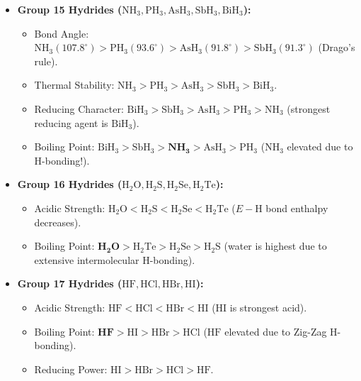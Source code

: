 \documentclass[11pt,a4paper]{article}
\begin{document}
\begin{usecasebox}
\begin{itemize}
  \item \textbf{Group 15 Hydrides ($\text{NH}_3, \text{PH}_3, \text{AsH}_3, \text{SbH}_3, \text{BiH}_3$):}
  \begin{itemize}
    \item Bond Angle: $\text{NH}_3 (107.8^\circ) > \text{PH}_3 (93.6^\circ) > \text{AsH}_3 (91.8^\circ) > \text{SbH}_3 (91.3^\circ)$ (Drago's rule).
    \item Thermal Stability: $\text{NH}_3 > \text{PH}_3 > \text{AsH}_3 > \text{SbH}_3 > \text{BiH}_3$.
    \item Reducing Character: $\text{BiH}_3 > \text{SbH}_3 > \text{AsH}_3 > \text{PH}_3 > \text{NH}_3$ (strongest reducing agent is $\text{BiH}_3$).
    \item Boiling Point: $\text{BiH}_3 > \text{SbH}_3 > \mathbf{\text{NH}_3} > \text{AsH}_3 > \text{PH}_3$ ($\text{NH}_3$ elevated due to H-bonding!).
  \end{itemize}
  \item \textbf{Group 16 Hydrides ($\text{H}_2\text{O}, \text{H}_2\text{S}, \text{H}_2\text{Se}, \text{H}_2\text{Te}$):}
  \begin{itemize}
    \item Acidic Strength: $\text{H}_2\text{O} < \text{H}_2\text{S} < \text{H}_2\text{Se} < \text{H}_2\text{Te}$ ($E-\text{H}$ bond enthalpy decreases).
    \item Boiling Point: $\mathbf{\text{H}_2\text{O}} > \text{H}_2\text{Te} > \text{H}_2\text{Se} > \text{H}_2\text{S}$ (water is highest due to extensive intermolecular H-bonding).
  \end{itemize}
  \item \textbf{Group 17 Hydrides ($\text{HF}, \text{HCl}, \text{HBr}, \text{HI}$):}
  \begin{itemize}
    \item Acidic Strength: $\text{HF} < \text{HCl} < \text{HBr} < \text{HI}$ ($\text{HI}$ is strongest acid).
    \item Boiling Point: $\mathbf{\text{HF}} > \text{HI} > \text{HBr} > \text{HCl}$ ($\text{HF}$ elevated due to Zig-Zag H-bonding).
    \item Reducing Power: $\text{HI} > \text{HBr} > \text{HCl} > \text{HF}$.
  \end{itemize}
\end{itemize}
\end{usecasebox}
\end{document}

